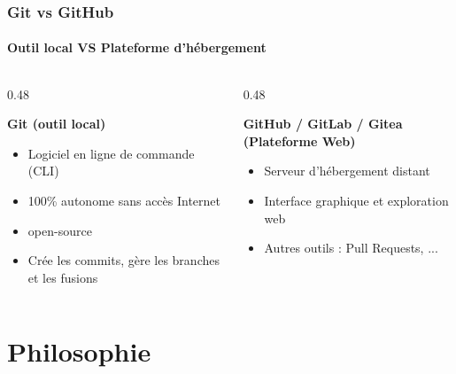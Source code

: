 \documentclass[
	11pt,
	aspectratio=169
]{beamer}
\begin{document}
\begin{frame}
    \frametitle{Git vs GitHub}
    \framesubtitle{Outil local VS Plateforme d'hébergement}

    \begin{columns}[t]
        \begin{column}{0.48\textwidth}
            \begin{block}{\centering \textbf{Git (outil local)}}
                \begin{itemize}
                    \item Logiciel en ligne de commande (CLI)
                    \item 100\% autonome sans accès Internet
                    \item open-source
                    \item Crée les commits, gère les branches et les fusions
                \end{itemize}
            \end{block}
        \end{column}

        \begin{column}{0.48\textwidth}
            \begin{exampleblock}{\centering \textbf{GitHub / GitLab / Gitea (Plateforme Web)}}
                \begin{itemize}
                    \item Serveur d'hébergement distant
                    \item Interface graphique et exploration web
                    \item Autres outils : Pull Requests, ...
                \end{itemize}
            \end{exampleblock}
        \end{column}
    \end{columns}
\end{frame}

\section{Philosophie}
\end{document}
